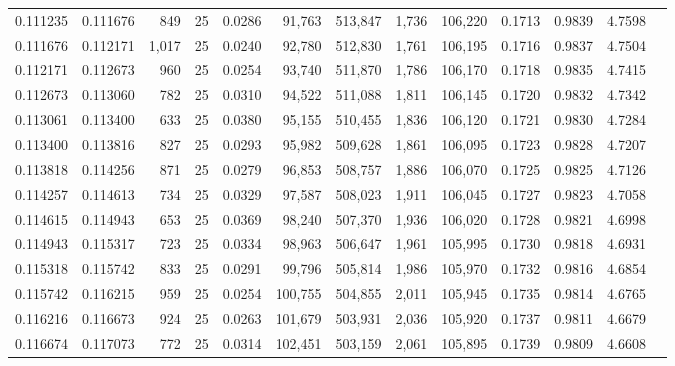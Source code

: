 \begin{tabular}{rrrrrrrrrrrrr}
0.111235 & 0.111676 &   849 &  25 &                                     0.0286 &  91,763 & 513,847 &   1,736 & 106,220 & 0.1713 & 0.9839 & 4.7598 \\
0.111676 & 0.112171 & 1,017 &  25 &                                     0.0240 &  92,780 & 512,830 &   1,761 & 106,195 & 0.1716 & 0.9837 & 4.7504 \\
0.112171 & 0.112673 &   960 &  25 &                                     0.0254 &  93,740 & 511,870 &   1,786 & 106,170 & 0.1718 & 0.9835 & 4.7415 \\
0.112673 & 0.113060 &   782 &  25 &                                     0.0310 &  94,522 & 511,088 &   1,811 & 106,145 & 0.1720 & 0.9832 & 4.7342 \\
0.113061 & 0.113400 &   633 &  25 &                                     0.0380 &  95,155 & 510,455 &   1,836 & 106,120 & 0.1721 & 0.9830 & 4.7284 \\
0.113400 & 0.113816 &   827 &  25 &                                     0.0293 &  95,982 & 509,628 &   1,861 & 106,095 & 0.1723 & 0.9828 & 4.7207 \\
0.113818 & 0.114256 &   871 &  25 &                                     0.0279 &  96,853 & 508,757 &   1,886 & 106,070 & 0.1725 & 0.9825 & 4.7126 \\
0.114257 & 0.114613 &   734 &  25 &                                     0.0329 &  97,587 & 508,023 &   1,911 & 106,045 & 0.1727 & 0.9823 & 4.7058 \\
0.114615 & 0.114943 &   653 &  25 &                                     0.0369 &  98,240 & 507,370 &   1,936 & 106,020 & 0.1728 & 0.9821 & 4.6998 \\
0.114943 & 0.115317 &   723 &  25 &                                     0.0334 &  98,963 & 506,647 &   1,961 & 105,995 & 0.1730 & 0.9818 & 4.6931 \\
0.115318 & 0.115742 &   833 &  25 &                                     0.0291 &  99,796 & 505,814 &   1,986 & 105,970 & 0.1732 & 0.9816 & 4.6854 \\
0.115742 & 0.116215 &   959 &  25 &                                     0.0254 & 100,755 & 504,855 &   2,011 & 105,945 & 0.1735 & 0.9814 & 4.6765 \\
0.116216 & 0.116673 &   924 &  25 &                                     0.0263 & 101,679 & 503,931 &   2,036 & 105,920 & 0.1737 & 0.9811 & 4.6679 \\
0.116674 & 0.117073 &   772 &  25 &                                     0.0314 & 102,451 & 503,159 &   2,061 & 105,895 & 0.1739 & 0.9809 & 4.6608 \\

\end{tabular}
